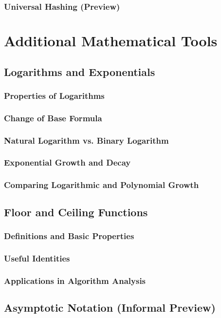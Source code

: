 \subsubsection{Universal Hashing (Preview)}

\section{Additional Mathematical Tools}
\subsection{Logarithms and Exponentials}
\subsubsection{Properties of Logarithms}
\subsubsection{Change of Base Formula}
\subsubsection{Natural Logarithm vs. Binary Logarithm}
\subsubsection{Exponential Growth and Decay}
\subsubsection{Comparing Logarithmic and Polynomial Growth}

\subsection{Floor and Ceiling Functions}
\subsubsection{Definitions and Basic Properties}
\subsubsection{Useful Identities}
\subsubsection{Applications in Algorithm Analysis}

\subsection{Asymptotic Notation (Informal Preview)}
